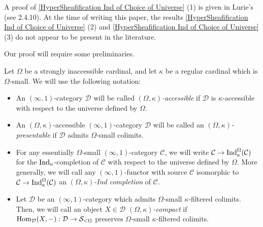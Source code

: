 \documentclass[10pt]{article}
\newcommand{\mS}{\mathcal S}
\newcommand{\C}{\mathcal C}
\newcommand{\cD}{\mathcal{D}}
\theoremstyle{witharg}
\theoremstyle{witharg}
\theoremstyle{witharg2}
\begin{document}
\begin{remark}{}

   A proof of \ref{HyperSheafification Ind of Choice of Universe} (1) is given in Lurie's  (see  2.4.10). At the time of writing this paper, the results \ref{HyperSheafification Ind of Choice of Universe} (2) and \ref{HyperSheafification Ind of Choice of Universe} (3) do not appear to be present in the literature. 
    
\end{remark}

\noindent Our proof will require some preliminaries. 



\begin{notation}{}

    Let $\Omega$ be a strongly inaccessible cardinal, and let $\kappa$ be a regular cardinal which is $\Omega$-small. We will use the following notation:

    \begin{itemize}
        \item [$\bullet$] An $(\infty,1)$-category $\cD$ will be called \emph{$(\Omega,\kappa)$-accessible} if $\cD$ is $\kappa$-accessible with respect to the universe defined by $\Omega$.

        \item [$\bullet$] An $(\Omega,\kappa)$-accessible $(\infty,1)$-category $\cD$ will be called an \emph{$(\Omega,\kappa)$-presentable} if $\cD$ admits $\Omega$-small colimits.

        \item [$\bullet$] For any essentially $\Omega$-small $(\infty,1)$-category $\C$, we will write $\C\rightarrow \textnormal{Ind}_\kappa^{\Omega}(\C)$ for the $\textnormal{Ind}_\kappa$-completion of $\C$ with respect to the universe defined by $\Omega$. More generally, we will call any $(\infty,1)$-functor with source $\C$ isomorphic to $\C\rightarrow \textnormal{Ind}_\kappa^{\Omega}(\C)$ an \emph{$(\Omega,\kappa)$-Ind completion} of $\C$. 

        \item [$\bullet$] Let $\cD$ be an $(\infty,1)$-category which admits $\Omega$-small $\kappa$-filtered colimits. Then, we will call an object $X\in \cD$ \emph{$(\Omega,\kappa)$-compact} if $\textnormal{Hom}_\cD(X,-):\cD\rightarrow \mS_{<\Omega}$ preserves $\Omega$-small $\kappa$-filtered colimits. 
        
    \end{itemize}
    
    
   
    
\end{notation}
\end{document}
